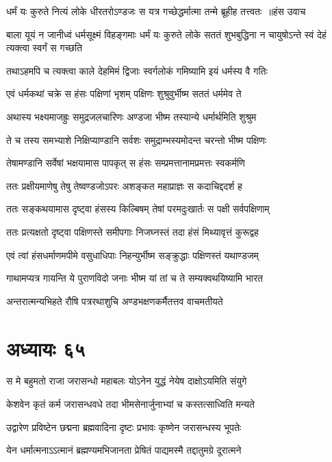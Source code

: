 \twolineshloka
{धर्मं यः कुरुते नित्यं लोके धीरतरोऽण्डजः}
{स यत्र गच्छेद्धर्मात्मा तन्मे ब्रूहीह तत्त्वतः ॥हंस उवाच}


\threelineshloka
{बाला यूयं न जानीध्वं धर्मसूक्ष्मं विहङ्गमाः}
{धर्मं यः कुरुते लोके सततं शुभबुद्धिना}
{न चायुषोऽन्ते स्वं देहं त्यक्त्वा स्वर्गं स गच्छति}


\twolineshloka
{तथाऽहमपि च त्यक्त्वा काले देहमिमं द्विजाः}
{स्वर्गलोकं गमिष्यामि इयं धर्मस्य वै गतिः}


\twolineshloka
{एवं धर्मकथां चक्रे स हंसः पक्षिणां भृशम्}
{पक्षिणः शुश्रुवुर्भीष्म सततं धर्ममेव ते}


\twolineshloka
{अथास्य भक्ष्यमाजह्रुः समुद्रजलचारिणः}
{अण्डजा भीष्म तस्यान्ये धर्मार्थमिति शुश्रुम}


\twolineshloka
{ते च तस्य समभ्याशे निक्षिप्याण्डानि सर्वशः}
{समुद्राम्भस्यमोदन्त चरन्तो भीष्म पक्षिणः}


\twolineshloka
{तेषामण्डानि सर्वेषां भक्षयामास पापकृत्}
{स हंसः सम्प्रमत्तानामप्रमत्तः स्वकर्मणि}


\twolineshloka
{ततः प्रक्षीयमाणेषु तेषु तेष्वण्डजोऽपरः}
{अशङ्कत महाप्राज्ञः स कदाचिद्ददर्श ह}


\twolineshloka
{ततः सङ्कथयामास दृष्ट्वा हंसस्य किल्बिषम्}
{तेषां परमदुःखार्तः स पक्षी सर्वपक्षिणाम्}


\twolineshloka
{ततः प्रत्यक्षतो दृष्ट्वा पक्षिणस्ते समीपगाः}
{निजघ्नस्तं तदा हंसं मिथ्यावृत्तं कुरूद्वह}


\twolineshloka
{एवं त्वां हंसधर्माणमपीमे वसुधाधिपाः}
{निहन्युर्भीष्म सङ्क्रुद्धाः पक्षिणस्तं यथाण्डजम्}


\twolineshloka
{गाथामप्यत्र गायन्ति ये पुराणविदो जनाः}
{भीष्म यां तां च ते सम्यक्वथयिष्यामि भारत}


\twolineshloka
{अन्तरात्मन्यभिहते रौषि पत्ररथाशुचि}
{अण्डभक्षणकर्मैतत्तव वाचमतीयते}


\chapter{अध्यायः ६५}
\twolineshloka
{स मे बहुमतो राजा जरासन्धो महाबलः}
{योऽनेन युद्धं नेयेष दाक्षोऽयमिति संयुगे}


\twolineshloka
{केशवेन कृतं कर्म जरासन्धवधे तदा}
{भीमसेनार्जुनाभ्यां च कस्तत्साध्विति मन्यते}


\twolineshloka
{उद्वारेण प्रविष्टेन छद्मना ब्रह्मवादिना}
{दृष्टः प्रभावः कृष्णेन जरासन्धस्य भूपतेः}


\twolineshloka
{येन धर्मात्मनाऽऽत्मानं ब्रह्मण्यमभिजानता}
{प्रेषितं पाद्यमस्मै तद्दातुमग्रे दूरात्मने}


